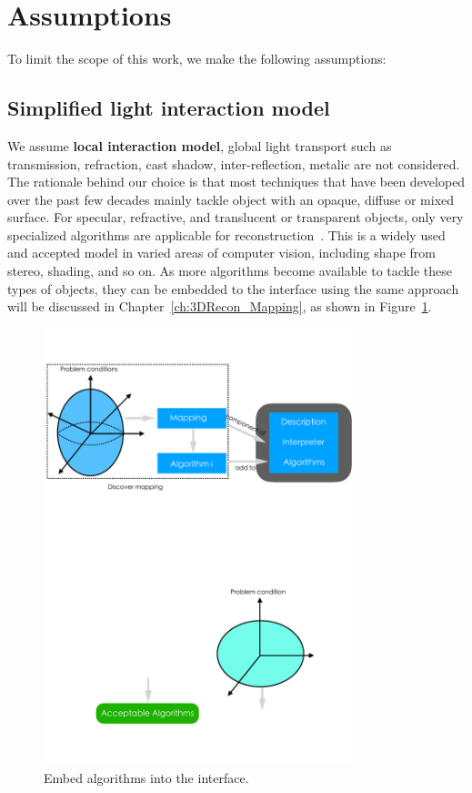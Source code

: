 \section{Assumptions}
To limit the scope of this work, we make the following assumptions:

\subsection{Simplified light interaction model}
We assume \textbf{local interaction model}, \ie global light transport such as transmission, refraction, cast shadow, inter-reflection, metalic are not considered. The rationale behind our choice is that most techniques that have been developed over the past few decades mainly tackle object with an opaque, diffuse or mixed surface. For specular, refractive, and translucent or transparent objects, only very specialized algorithms are applicable for reconstruction~\cite{ihrke2010transparent}. This is a widely used and accepted model in varied areas of computer vision, including shape from stereo, shading, and so on. As more algorithms become available to tackle these types of objects, they can be embedded to the interface using the same approach will be discussed in Chapter~\ref{ch:3DRecon_Mapping}, as shown in Figure~\ref{fig:embed_algo}.
\begin{figure}[!htbp]
\centering
\includegraphics[width=0.8\textwidth]{img/prob_space/embed_algo.pdf}
\caption{Embed algorithms into the interface.}
\label{fig:embed_algo}
\end{figure}

